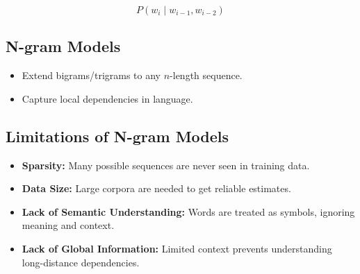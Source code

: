 \[
P(w_i \mid w_{i-1}, w_{i-2})
\]

\subsection*{N-gram Models}

\begin{itemize}
    \item Extend bigrams/trigrams to any \( n \)-length sequence.
    \item Capture local dependencies in language.
\end{itemize}

\subsection*{Limitations of N-gram Models}

\begin{itemize}
    \item \textbf{Sparsity:} Many possible sequences are never seen in training data.
    \item \textbf{Data Size:} Large corpora are needed to get reliable estimates.
    \item \textbf{Lack of Semantic Understanding:} Words are treated as symbols, ignoring meaning and context.
    \item \textbf{Lack of Global Information:} Limited context prevents understanding long-distance dependencies.
\end{itemize}
